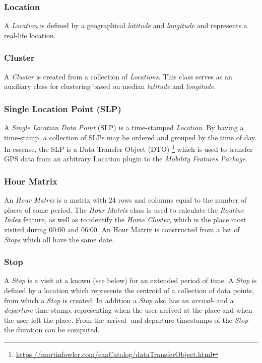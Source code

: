 \subsubsection*{Location}
A \textit{Location} is defined by a geographical \textit{latitude} and \textit{longitude} and represents a real-life location.

\subsubsection*{Cluster}
A \textit{Cluster} is created from a collection of \textit{Locations}. This class serves as an auxiliary class for clustering based on median \textit{latitude} and \textit{longitude}.

\subsubsection*{Single Location Point (SLP)}
A \textit{Single Location Data Point} (SLP) is a time-stamped \textit{Location}. By having a time-stamp, a collection of SLPs may be ordered and grouped by the time of day. In essense, the SLP is a Data Transfer Object (DTO) \footnote{\url{https://martinfowler.com/eaaCatalog/dataTransferObject.html}} which is used to transfer GPS data from an arbitrary Location plugin to the \textit{Mobility Features Package}.

\subsubsection*{Hour Matrix}
An \textit{Hour Matrix} is a matrix with 24 rows and columns equal to the number of places of some period. The \textit{Hour Matrix} class is used to calculate the \textit{Routine Index} feature, as well as to identify the \textit{Home Cluster}, which is the place most visited during 00:00 and 06:00. An Hour Matrix is constructed from a list of \textit{Stops} which all have the same date.

\subsubsection*{Stop}
A \textit{Stop} is a visit at a known  (see below) for an extended period of time. A \textit{Stop} is defined by a location which represents the centroid of a collection of data points, from which a \textit{Stop} is created. In addition a \textit{Stop} also has an \textit{arrival}- and a \textit{departure} time-stamp, representing when the user arrived at the place and when the user left the place. From the arrival- and departure timestamps of the \textit{Stop} the duration can be computed.


